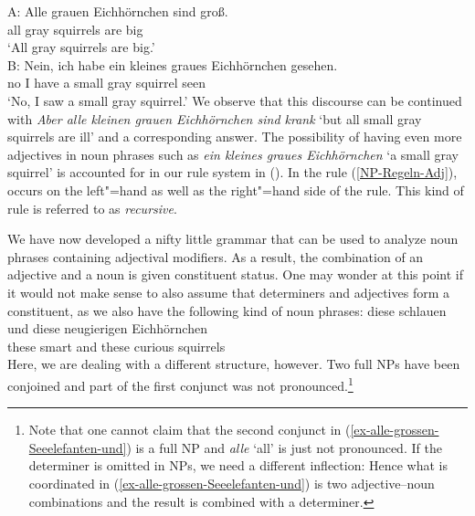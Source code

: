\ea
\label{Beispiel-Iteration-Adjektive}
\gll A: Alle grauen Eichhörnchen sind groß.\\
\spacebr{} all gray squirrels are big\\
\glt \hphantom{A:~}`All gray squirrels are big.'\\
\gll B: Nein, ich habe ein kleines graues Eichhörnchen gesehen.\\
	\spacebr{} no I have a small gray squirrel seen\\
\glt \hphantom{B:~}`No, I saw a small gray squirrel.'
\z
We observe that this discourse can be continued with \emph{Aber alle kleinen grauen Eichhörnchen
  sind krank} `but all small gray squirrels are ill' and a corresponding answer. The possibility
  of having even more adjectives in noun phrases such as \emph{ein kleines graues Eichhörnchen} `a
  small gray squirrel' is accounted for in our rule system in (). In the rule
  (\ref{NP-Regeln-Adj}), \nbar occurs on the left"=hand as well as the right"=hand 
  side of the rule. This kind of rule is referred to as \emph{recursive}.

\largerpage
We have now developed a nifty little grammar that can be used to analyze noun phrases containing
adjectival modifiers. As a result, the combination of an adjective and a noun is given constituent
status. One may wonder at this point if it would not make sense to also assume that determiners and
adjectives form a constituent, as we also have the following kind of noun phrases: 
\ea
\gll diese schlauen und diese neugierigen Eichhörnchen\\
     these smart    and these curious     squirrels\\
\z
Here, we are dealing with a different structure, however. Two full NPs have been
conjoined and part of the first conjunct was not pronounced.\footnote{
  Note that one cannot claim that the second conjunct in (\ref{ex-alle-grossen-Seeelefanten-und}) is
  a full NP and \emph{alle} `all' is just not pronounced. If the determiner is omitted in 
  NPs, we need a different inflection:
\eal
{}
\zl
Hence what is coordinated in (\ref{ex-alle-grossen-Seeelefanten-und}) is two adjective--noun
combinations and the result is combined with a determiner.
}


